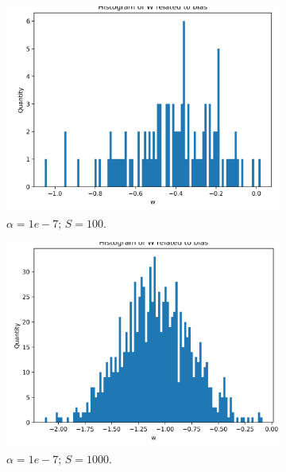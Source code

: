 \documentclass{article}
\begin{document}
\begin{figure}
  \centering
  \begin{subfigure}[t]{0.24\textwidth}
    \centering
    \includegraphics[width=\linewidth]{hist_featbias_1_sample_100.png}
    \caption{$\alpha = 1e-7$; $S = 100$.}
  \end{subfigure}
  \hfill
  \begin{subfigure}[t]{0.24\textwidth}
    \centering
    \includegraphics[width=\linewidth]{hist_featbias_1_sample_1000.png}
    \caption{$\alpha = 1e-7$; $S = 1000$.}
  \end{subfigure}
  \hfill
  \begin{subfigure}[t]{0.24\textwidth}
    \centering

\end{subfigure}
\end{figure}
\end{document}
